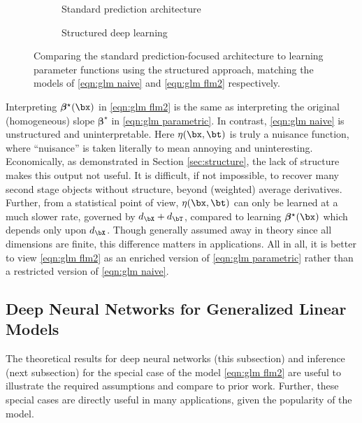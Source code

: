 \documentclass[12pt]{article}
\numberwithin{equation}{section}
\theoremstyle{definition}
\newcommand{\bbeta}{\boldsymbol{\beta}}
\newcommand{\bbtrue}{\bbeta^\star}
\newcommand{\dx}{d_{\bX}}  %
\newcommand{\dt}{d_{\bT}}  %
\begin{document}
\begin{appendices}
\begin{figure}
	\centering
	\begin{subfigure}[b]{0.4\textwidth}
		\centering
		\hspace{-0.5in}\scalebox{0.8}{}
		\caption{Standard prediction architecture}
	\end{subfigure}
	\begin{subfigure}[b]{0.5\textwidth}
	\centering
		\scalebox{0.8}{}
		\caption{Structured deep learning}
	\end{subfigure}
	\caption{Comparing the standard prediction-focused architecture to learning parameter functions using the structured approach, matching the models of \eqref{eqn:glm naive} and \eqref{eqn:glm flm2} respectively.}
	\label{fig:arch-glm}
\end{figure}

Interpreting $\bbtrue(\bx)$ in \eqref{eqn:glm flm2} is the same as interpreting the original (homogeneous) slope $\bbtrue$ in \eqref{eqn:glm parametric}. In contrast, \eqref{eqn:glm naive} is unstructured and uninterpretable. Here $\eta(\bx,\bt)$ is truly a nuisance function, where ``nuisance'' is taken literally to mean annoying and uninteresting. Economically, as demonstrated in Section \ref{sec:structure}, the lack of structure makes this output not useful. It is difficult, if not impossible, to recover many second stage objects without structure, beyond (weighted) average derivatives. Further, from a statistical point of view, $\eta(\bx,\bt)$ can only be learned at a much slower rate, governed by $\dx + \dt$, compared to learning $\bbtrue(\bx)$ which depends only upon $\dx$. Though generally assumed away in theory since all dimensions are finite, this difference matters in applications. All in all, it is better to view \eqref{eqn:glm flm2} as an enriched version of \eqref{eqn:glm parametric} rather than a restricted version of \eqref{eqn:glm naive}. 




\subsection{Deep Neural Networks for Generalized Linear Models}

The theoretical results for deep neural networks (this subsection) and inference (next subsection) for the special case of the model \eqref{eqn:glm flm2} are useful to illustrate the required assumptions and compare to prior work. Further, these special cases are directly useful in many applications, given the popularity of the model.


\end{appendices}
\end{document}
